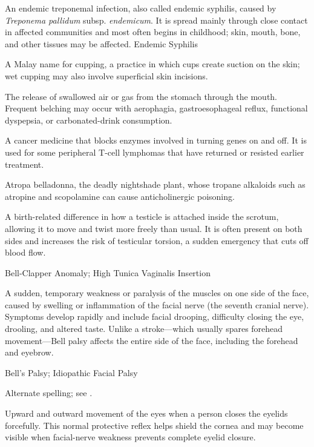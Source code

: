  An endemic treponemal infection, also called endemic syphilis, caused by \textit{Treponema pallidum} subsp. \textit{endemicum}. It is spread mainly through close contact in affected communities and most often begins in childhood; skin, mouth, bone, and other tissues may be affected.
\synonyms
Endemic Syphilis

 A Malay name for cupping, a practice in which cups create suction on the skin; wet cupping may also involve superficial skin incisions.

 The release of swallowed air or gas from the stomach through the mouth. Frequent
belching may occur with aerophagia, gastroesophageal reflux, functional dyspepsia, or
carbonated-drink consumption.

 A cancer medicine that blocks enzymes involved in turning genes on and off. It is used for some peripheral T-cell lymphomas that have returned or resisted earlier treatment.

 Atropa belladonna, the deadly nightshade plant, whose tropane alkaloids such as atropine and scopolamine can cause anticholinergic poisoning.

 A birth-related difference in how a testicle is attached inside the scrotum, allowing it to move and twist more freely than usual. It is often present on both sides and increases the risk of testicular torsion, a sudden emergency that cuts off blood flow.

\synonyms
Bell-Clapper Anomaly; High Tunica Vaginalis Insertion

 A sudden, temporary weakness or paralysis of the muscles on one side of the face, caused by swelling or inflammation of the facial nerve (the seventh cranial nerve). Symptoms develop rapidly and include facial drooping, difficulty closing the eye, drooling, and altered taste. Unlike a stroke---which usually spares forehead movement---Bell palsy affects the entire side of the face, including the forehead and eyebrow.

\synonyms
Bell's Palsy; Idiopathic Facial Palsy

 Alternate spelling; see .

 Upward and outward movement of the eyes when a person closes the eyelids forcefully. This normal protective reflex helps shield the cornea and may become visible when facial-nerve weakness prevents complete eyelid closure.

